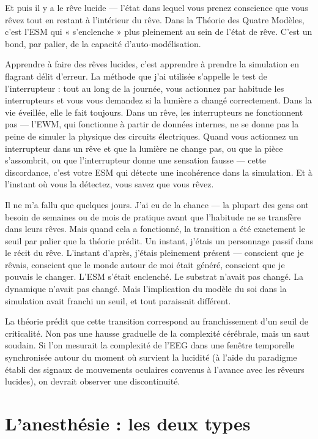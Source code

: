 \documentclass[11pt, twoside, openright]{book}
\begin{document}
Et puis il y a le rêve lucide --- l'état dans lequel vous prenez conscience que vous rêvez tout en restant à l'intérieur du rêve. Dans la Théorie des Quatre Modèles, c'est l'ESM qui « s'enclenche » plus pleinement au sein de l'état de rêve. C'est un bond, par palier, de la capacité d'auto-modélisation.

Apprendre à faire des rêves lucides, c'est apprendre à prendre la simulation en flagrant délit d'erreur. La méthode que j'ai utilisée s'appelle le test de l'interrupteur : tout au long de la journée, vous actionnez par habitude les interrupteurs et vous vous demandez si la lumière a changé correctement. Dans la vie éveillée, elle le fait toujours. Dans un rêve, les interrupteurs ne fonctionnent pas --- l'EWM, qui fonctionne à partir de données internes, ne se donne pas la peine de simuler la physique des circuits électriques. Quand vous actionnez un interrupteur dans un rêve et que la lumière ne change pas, ou que la pièce s'assombrit, ou que l'interrupteur donne une sensation fausse --- cette discordance, c'est votre ESM qui détecte une incohérence dans la simulation. Et à l'instant où vous la détectez, vous savez que vous rêvez.

Il ne m'a fallu que quelques jours. J'ai eu de la chance --- la plupart des gens ont besoin de semaines ou de mois de pratique avant que l'habitude ne se transfère dans leurs rêves. Mais quand cela a fonctionné, la transition a été exactement le seuil par palier que la théorie prédit. Un instant, j'étais un personnage passif dans le récit du rêve. L'instant d'après, j'étais pleinement présent --- conscient que je rêvais, conscient que le monde autour de moi était généré, conscient que je pouvais le changer. L'ESM s'était enclenché. Le substrat n'avait pas changé. La dynamique n'avait pas changé. Mais l'implication du modèle du soi dans la simulation avait franchi un seuil, et tout paraissait différent.

La théorie prédit que cette transition correspond au franchissement d'un seuil de criticalité. Non pas une hausse graduelle de la complexité cérébrale, mais un saut soudain. Si l'on mesurait la complexité de l'EEG dans une fenêtre temporelle synchronisée autour du moment où survient la lucidité (à l'aide du paradigme établi des signaux de mouvements oculaires convenus à l'avance avec les rêveurs lucides), on devrait observer une discontinuité.

\section*{L'anesthésie : les deux types}
\end{document}
